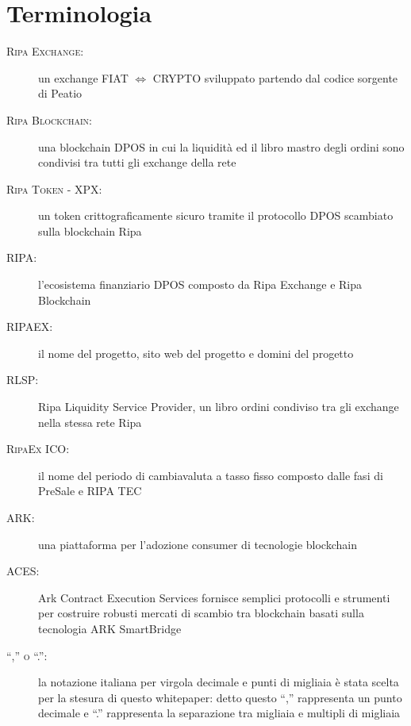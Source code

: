 \documentclass[11pt,fleqn]{book} %
\begin{document}
\section{Terminologia}
\begin{description}
	\item[\textsc{Ripa Exchange:}] un exchange FIAT $\Leftrightarrow$ CRYPTO sviluppato partendo dal codice sorgente di Peatio \cite{peatio}
	\item[\textsc{Ripa Blockchain:}] una blockchain DPOS in cui la liquidità ed il libro mastro degli ordini sono condivisi tra tutti gli exchange della rete
	\item[\textsc{Ripa Token - XPX:}] un token crittograficamente sicuro tramite il protocollo DPOS scambiato sulla blockchain Ripa 
	\item[\textsc{RIPA:}] l'ecosistema finanziario DPOS composto da Ripa Exchange e Ripa Blockchain
	\item[\textsc{RIPAEX:}] il nome del progetto, sito web del progetto e domini del progetto
	\item[\textsc{RLSP:}] Ripa Liquidity Service Provider, un libro ordini condiviso tra gli exchange nella stessa rete Ripa
	\item[\textsc{RipaEx ICO:}] il nome del periodo di cambiavaluta a tasso fisso composto dalle fasi di PreSale e RIPA TEC	
	\item[\textsc{ARK:}] una piattaforma per l'adozione consumer di tecnologie blockchain \cite{ark}
	\item[\textsc{ACES:}] Ark Contract Execution Services \cite{aces} fornisce semplici protocolli e strumenti per costruire robusti
	mercati di scambio tra blockchain basati sulla tecnologia ARK SmartBridge
	\item[\textsc{``,'' o ``.'':}] la notazione italiana per virgola decimale e punti di migliaia è stata scelta per la stesura di questo 
	whitepaper: detto questo “,” rappresenta un punto decimale e “.” rappresenta la separazione tra migliaia e multipli di migliaia 
\end{description}

\end{document}
